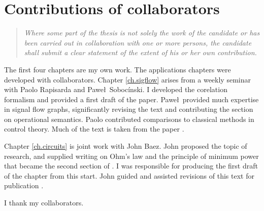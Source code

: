 \section{Contributions of collaborators}

\begin{quotation}
  \emph{
Where some part of the thesis is not solely the work of the candidate or has
been carried out in collaboration with one or more persons, the candidate shall
submit a clear statement of the extent of his or her own contribution.
}
\end{quotation}

The first four chapters are my own work. The applications chapters were
developed with collaborators. Chapter \ref{ch.sigflow} arises from a weekly
seminar with Paolo Rapisarda and Pawe\l\ Soboc\'inski. I developed the
corelation formalism and provided a first draft of the paper. Pawe\l\ provided
much expertise in signal flow graphs, significantly revising the text and
contributing the section on operational semantics. Paolo contributed comparisons
to classical methods in control theory.  Much of the text is taken from the
paper \cite{FRS16}.

Chapter \ref{ch.circuits} is joint work with John Baez. John proposed the topic
of research, and supplied writing on Ohm's law and the principle of minimum
power that became the second section of . I was responsible for producing the
first draft of the chapter from this start.  John guided and assisted revisions
of this text for publication \cite{BF}.

I thank my collaborators.

